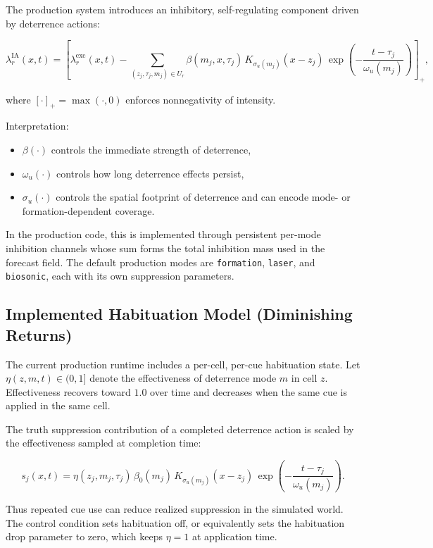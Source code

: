 The production system introduces an inhibitory, self-regulating component driven by deterrence actions:

\begin{equation}
\lambda_r^{\mathrm{IA}}(x,t)
=
\left[
\lambda_r^{\mathrm{exc}}(x,t)
-
\sum_{(z_j,\tau_j,m_j)\in U_r}
\beta(m_j,x,\tau_j)\,
K_{\sigma_u(m_j)}(x-z_j)\,
\exp\!\left(-\frac{t-\tau_j}{\omega_u(m_j)}\right)
\right]_+,
\end{equation}

where $[\cdot]_+ = \max(\cdot,0)$ enforces nonnegativity of intensity.

Interpretation:

\begin{itemize}
\item $\beta(\cdot)$ controls the immediate strength of deterrence,
\item $\omega_u(\cdot)$ controls how long deterrence effects persist,
\item $\sigma_u(\cdot)$ controls the spatial footprint of deterrence and can encode mode- or formation-dependent coverage.
\end{itemize}

In the production code, this is implemented through persistent per-mode inhibition channels whose sum forms the total inhibition mass used in the forecast field. The default production modes are \texttt{formation}, \texttt{laser}, and \texttt{biosonic}, each with its own suppression parameters.

\subsection{Implemented Habituation Model (Diminishing Returns)}

The current production runtime includes a per-cell, per-cue habituation state. Let $\eta(z,m,t) \in (0,1]$ denote the effectiveness of deterrence mode $m$ in cell $z$. Effectiveness recovers toward $1.0$ over time and decreases when the same cue is applied in the same cell.

The truth suppression contribution of a completed deterrence action is scaled by the effectiveness sampled at completion time:

\begin{equation}
s_{j}(x,t)
=
\eta(z_j,m_j,\tau_j)\,
\beta_0(m_j)\,
K_{\sigma_u(m_j)}(x-z_j)\,
\exp\!\left(-\frac{t-\tau_j}{\omega_u(m_j)}\right).
\end{equation}

Thus repeated cue use can reduce realized suppression in the simulated world. The control condition sets habituation off, or equivalently sets the habituation drop parameter to zero, which keeps $\eta=1$ at application time.



